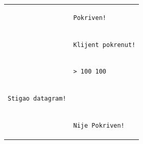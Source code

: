 \documentclass[]{article}
\begin{document}
\begin{enumerate}
\begin{tabular}{ll}
\begin{lstlisting}
\end{lstlisting}&\begin{lstlisting}
Pokriven!
\end{lstlisting}\\
&\begin{lstlisting}
Klijent pokrenut!
\end{lstlisting}\\
&\begin{lstlisting}
> 100 100
\end{lstlisting}\\
\begin{lstlisting}
Stigao datagram!
\end{lstlisting}& \\
\begin{lstlisting}
\end{lstlisting}&\begin{lstlisting}
Nije Pokriven!
\end{lstlisting}\\
\end{tabular}
\end{enumerate}
\end{document}
